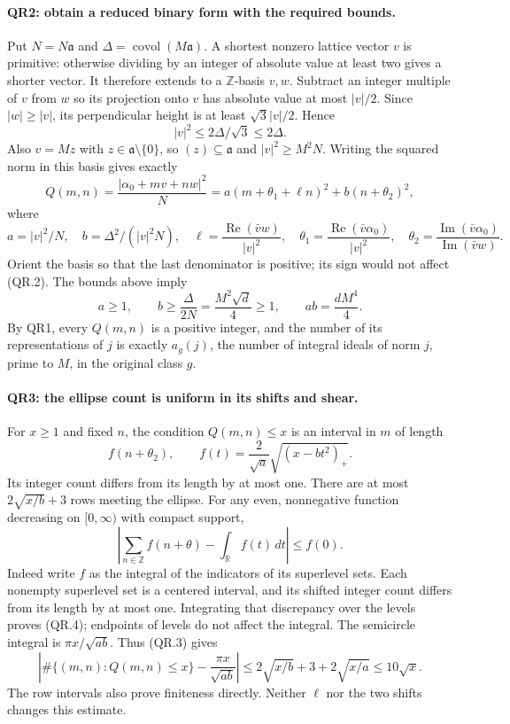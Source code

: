 \paragraph{QR2: obtain a reduced binary form with the required bounds.}
Put $N=N\mathfrak a$ and $\Delta=\operatorname{covol}(M\mathfrak a)$.
A shortest nonzero lattice vector $v$ is primitive: otherwise dividing
by an integer of absolute value at least two gives a shorter vector.
It therefore extends to a $\mathbb Z$-basis $v,w$. Subtract an integer
multiple of $v$ from $w$ so its projection onto $v$ has absolute value
at most $|v|/2$. Since $|w|\ge|v|$, its perpendicular height is at
least $\sqrt3|v|/2$. Hence
\[
 |v|^2\le2\Delta/\sqrt3\le2\Delta.
\]
Also $v=Mz$ with $z\in\mathfrak a\setminus\{0\}$, so
$(z)\subseteq\mathfrak a$ and $|v|^2\ge M^2N$.
Writing the squared norm in this basis gives exactly
\[
 Q(m,n)=\frac{|\alpha_0+mv+nw|^2}{N}
       =a(m+\theta_1+\ell n)^2+b(n+\theta_2)^2,           \tag{QR.2}
\]
where
\[
 a=|v|^2/N,\quad b=\Delta^2/(|v|^2N),\quad
 \ell=\frac{\operatorname{Re}(\bar v w)}{|v|^2},\quad
 \theta_1=\frac{\operatorname{Re}(\bar v\alpha_0)}{|v|^2},\quad
 \theta_2=\frac{\operatorname{Im}(\bar v\alpha_0)}
                  {\operatorname{Im}(\bar v w)}.
\]
Orient the basis so that the last denominator is positive; its sign
would not affect (QR.2). The bounds above imply
\[
 a\ge1,\qquad b\ge\frac{\Delta}{2N}
                 =\frac{M^2\sqrt d}{4}\ge1,\qquad
 ab=\frac{dM^4}{4}.                                      \tag{QR.3}
\]
By QR1, every $Q(m,n)$ is a positive integer, and the number of its
representations of $j$ is exactly $a_g(j)$, the number of integral
ideals of norm $j$, prime to $M$, in the original class $g$.

\paragraph{QR3: the ellipse count is uniform in its shifts and shear.}
For $x\ge1$ and fixed $n$, the condition $Q(m,n)\le x$ is an interval
in $m$ of length
\[
 f(n+\theta_2),\qquad
 f(t)=\frac2{\sqrt a}\sqrt{(x-bt^2)_+}.
\]
Its integer count differs from its length by at most one. There are
at most $2\sqrt{x/b}+3$ rows meeting the ellipse. For any even,
nonnegative function decreasing on $[0,\infty)$ with compact support,
\[
 \left|\sum_{n\in\mathbb Z}f(n+\theta)-\int_{\mathbb R}f(t)\,dt\right|
 \le f(0).                                                \tag{QR.4}
\]
Indeed write $f$ as the integral of the indicators of its superlevel
sets. Each nonempty superlevel set is a centered interval, and its
shifted integer count differs from its length by at most one.
Integrating that discrepancy over the levels proves (QR.4); endpoints
of levels do not affect the integral. The semicircle integral is
$\pi x/\sqrt{ab}$. Thus (QR.3) gives
\[
 \left|\#\{(m,n):Q(m,n)\le x\}-\frac{\pi x}{\sqrt{ab}}\right|
 \le2\sqrt{x/b}+3+2\sqrt{x/a}\le10\sqrt x.                 \tag{QR.5}
\]
The row intervals also prove finiteness directly. Neither $\ell$ nor
the two shifts changes this estimate.

